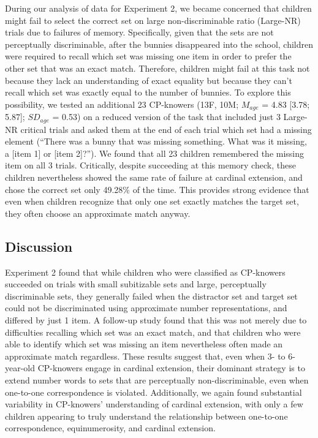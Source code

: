 \documentclass[
  man,floatsintext]{apa7}
\begin{document}
During our analysis of data for Experiment 2, we became concerned that children might fail to select the correct set on large non-discriminable ratio (Large-NR) trials due to failures of memory. Specifically, given that the sets are not perceptually discriminable, after the bunnies disappeared into the school, children were required to recall which set was missing one item in order to prefer the other set that was an exact match. Therefore, children might fail at this task not because they lack an understanding of exact equality but because they can't recall which set was exactly equal to the number of bunnies. To explore this possibility, we tested an additional 23 CP-knowers (13F, 10M; \(M_{age}\) = 4.83 {[}3.78; 5.87{]}; \(SD_{age}\) = 0.53) on a reduced version of the task that included just 3 Large-NR critical trials and asked them at the end of each trial which set had a missing element (``There was a bunny that was missing something. What was it missing, a {[}item 1{]} or {[}item 2{]}?''). We found that all 23 children remembered the missing item on all 3 trials. Critically, despite succeeding at this memory check, these children nevertheless showed the same rate of failure at cardinal extension, and chose the correct set only 49.28\% of the time. This provides strong evidence that even when children recognize that only one set exactly matches the target set, they often choose an approximate match anyway.

\subsection{Discussion}\label{discussion-1}

Experiment 2 found that while children who were classified as CP-knowers succeeded on trials with small subitizable sets and large, perceptually discriminable sets, they generally failed when the distractor set and target set could not be discriminated using approximate number representations, and differed by just 1 item. A follow-up study found that this was not merely due to difficulties recalling which set was an exact match, and that children who were able to identify which set was missing an item nevertheless often made an approximate match regardless. These results suggest that, even when 3- to 6-year-old CP-knowers engage in cardinal extension, their dominant strategy is to extend number words to sets that are perceptually non-discriminable, even when one-to-one correspondence is violated. Additionally, we again found substantial variability in CP-knowers' understanding of cardinal extension, with only a few children appearing to truly understand the relationship between one-to-one correspondence, equinumerosity, and cardinal extension.
\end{document}
